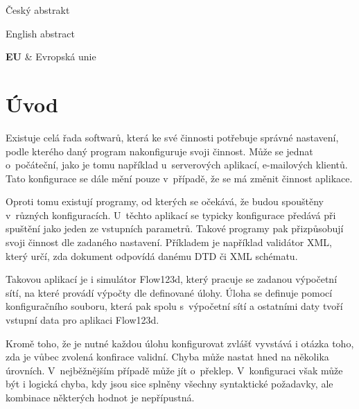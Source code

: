 \documentclass[FM,DP]{tulthesis}
\begin{document}

\begin{abstractCZ}
\thispagestyle{empty}
Český abstrakt
\end{abstractCZ}

\vspace{2cm}
\begin{abstractEN}
English abstract
\end{abstractEN}

\clearpage
\begin{acknowledgement}

\end{acknowledgement}

\tableofcontents
\clearpage

\begin{abbrList}
\textbf{EU} & Evropská unie \\
\end{abbrList}

\chapter*{Úvod}

Existuje celá řada softwarů, která ke své činnosti potřebuje správné nastavení, podle kterého daný program nakonfiguruje svoji činnost. Může se jednat o~počáteční, jako je tomu například u~serverových aplikací, e-mailových klientů. Tato konfigurace se dále mění pouze v~případě, že se má změnit činnost aplikace.

Oproti tomu existují programy, od kterých se očekává, že budou spouštěny v~různých konfiguracích. U~těchto aplikací se typicky konfigurace předává při spuštění jako jeden ze vstupních parametrů. Takové programy pak přizpůsobují svoji činnost dle zadaného nastavení. Příkladem je například validátor XML, který určí, zda dokument odpovídá danému DTD či XML schématu.

Takovou aplikací je i simulátor Flow123d, který pracuje se zadanou výpočetní sítí, na které provádí výpočty dle definované úlohy. Úloha se definuje pomocí konfiguračního souboru, která pak spolu s~výpočetní sítí a ostatními daty tvoří vstupní data pro aplikaci Flow123d.

Kromě toho, že je nutné každou úlohu konfigurovat zvlášť vyvstává i otázka toho, zda je vůbec zvolená konfirace validní. Chyba může nastat hned na několika úrovních. V~nejběžnějším případě může jít o~překlep. V~konfiguraci však může být i logická chyba, kdy jsou sice splněny všechny syntaktické požadavky, ale kombinace některých hodnot je nepřípustná.
\end{document}
